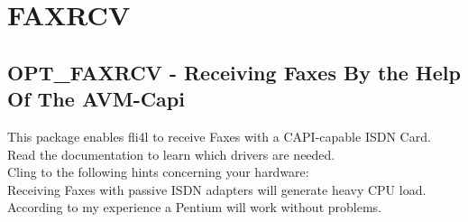 {
\section{FAXRCV}
}

\subsection {OPT\_FAXRCV - Receiving Faxes By the Help Of The AVM-Capi }

  This package enables fli4l to receive Faxes with a CAPI-capable
  ISDN Card. Read the documentation to learn which drivers are needed.\\

  Cling to the following hints concerning your hardware:\\

  Receiving Faxes with passive ISDN adapters will generate heavy CPU load.
  According to my experience a Pentium will work without problems.

